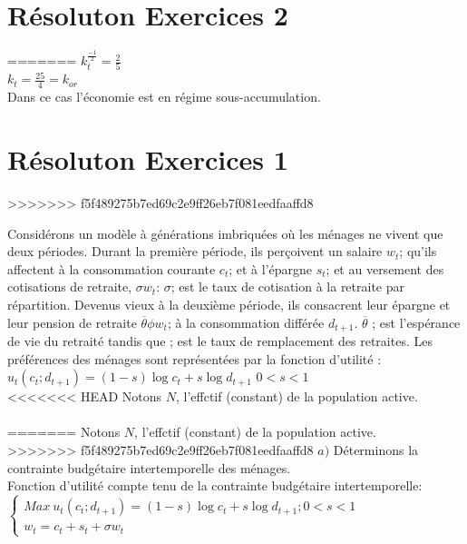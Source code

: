 \documentclass[11pt,twoside,a4paper]{article}
\begin{document}
  \section*{Résoluton Exercices 2}
=======
  $k_t^\frac{-1}{2}=\frac{2}{5}$\\
  $k_t=\frac{25}{4}=k_{or}$\\
  Dans ce cas l'économie est en régime sous-accumulation.\\
  
  \section*{Résoluton Exercices 1}
>>>>>>> f5f489275b7ed69c2e9ff26eb7f081eedfaaffd8
  
  Considérons un modèle à générations imbriquées où les ménages ne vivent que deux périodes. Durant la première période, ils perçoivent un salaire $w_t$; qu'ils affectent à la  consommation courante $c_t$; et à l'épargne $s_t$; et au versement des cotisations de retraite, $\sigma w_t$: $\sigma$; est le taux de cotisation à la retraite par répartition. Devenus vieux à la deuxième période, ils consacrent leur épargne et leur pension de retraite $\overline{\theta}\phi w_t$; à la consommation différée $d_{t+1}$.
$\overline{\theta}$ ; est l'espérance de vie du retraité tandis que ; est le taux de remplacement
des retraites. Les préférences des ménages sont représentées par la fonction d'utilité :\\
$u_t(c_t; d_{t+1})=(1-s)\log{c_t} + s\log{d_{t+1}}$ \: $0<s<1$
\\
<<<<<<< HEAD
Notons $N$, l'effctif (constant) de la population active.\\\\
=======
Notons $N$, l'effctif (constant) de la population active.\\

>>>>>>> f5f489275b7ed69c2e9ff26eb7f081eedfaaffd8
$a)$ Déterminons la contrainte budgétaire intertemporelle des ménages.\\

Fonction d'utilité compte tenu de la contrainte budgétaire intertemporelle:\\

$ \left\{\begin{array}{rl}
 Max \ u_t(c_t; d_{t+1})=  (1-s)\log{c_t} + s\log{d_{t+1}} ; 0<s<1 \\
 
w_t  =  c_t + s_t +  \sigma w_t \end{array}\right. $  \\
\end{document}
